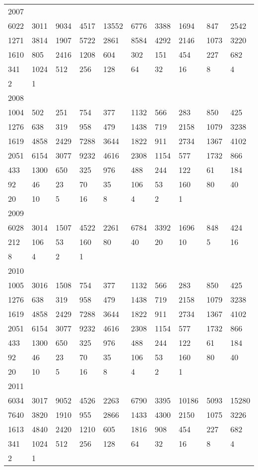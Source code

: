 \begin{longtable}{*{10}{l}}
2007&&&&&&&&&\\
6022& 3011& 9034& 4517& 13552& 6776& 3388& 1694& 847& 2542\\
1271& 3814& 1907& 5722& 2861& 8584& 4292& 2146& 1073& 3220\\
1610& 805& 2416& 1208& 604& 302& 151& 454& 227& 682\\
341& 1024& 512& 256& 128& 64& 32& 16& 8& 4\\
2& 1& \\

2008&&&&&&&&&\\
1004& 502& 251& 754& 377& 1132& 566& 283& 850& 425\\
1276& 638& 319& 958& 479& 1438& 719& 2158& 1079& 3238\\
1619& 4858& 2429& 7288& 3644& 1822& 911& 2734& 1367& 4102\\
2051& 6154& 3077& 9232& 4616& 2308& 1154& 577& 1732& 866\\
433& 1300& 650& 325& 976& 488& 244& 122& 61& 184\\
92& 46& 23& 70& 35& 106& 53& 160& 80& 40\\
20& 10& 5& 16& 8& 4& 2& 1& \\

2009&&&&&&&&&\\
6028& 3014& 1507& 4522& 2261& 6784& 3392& 1696& 848& 424\\
212& 106& 53& 160& 80& 40& 20& 10& 5& 16\\
8& 4& 2& 1& \\

2010&&&&&&&&&\\
1005& 3016& 1508& 754& 377& 1132& 566& 283& 850& 425\\
1276& 638& 319& 958& 479& 1438& 719& 2158& 1079& 3238\\
1619& 4858& 2429& 7288& 3644& 1822& 911& 2734& 1367& 4102\\
2051& 6154& 3077& 9232& 4616& 2308& 1154& 577& 1732& 866\\
433& 1300& 650& 325& 976& 488& 244& 122& 61& 184\\
92& 46& 23& 70& 35& 106& 53& 160& 80& 40\\
20& 10& 5& 16& 8& 4& 2& 1& \\

2011&&&&&&&&&\\
6034& 3017& 9052& 4526& 2263& 6790& 3395& 10186& 5093& 15280\\
7640& 3820& 1910& 955& 2866& 1433& 4300& 2150& 1075& 3226\\
1613& 4840& 2420& 1210& 605& 1816& 908& 454& 227& 682\\
341& 1024& 512& 256& 128& 64& 32& 16& 8& 4\\
2& 1& \\


\end{longtable}
